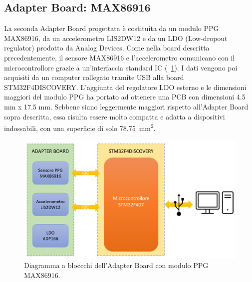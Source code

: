 \subsection{Adapter Board: MAX86916}
La seconda Adapter Board progettata è costituita da un modulo PPG MAX86916, da un accelerometro LIS2DW12 e da un LDO (Low-dropout regulator) prodotto da Analog Devices. Come nella board descritta precedentemente, il sensore MAX86916 e l'accelerometro comunicano con il microcontrollore grazie a un'interfaccia standard IC (\Fig~\ref{fig:DiagrammaBlocchiMAX86916}). I dati vengono poi acquisiti da un computer collegato tramite USB alla board STM32F4DISCOVERY. L'aggiunta del regolatore LDO esterno e le dimensioni maggiori del modulo PPG ha portato ad ottenere una PCB con dimensioni 4.5 mm x 17.5 mm. Sebbene siano leggermente maggiori rispetto all'Adapter Board sopra descritta, essa risulta essere molto compatta e adatta a dispositivi indossabili, con una superficie di solo \SI{78.75}{\square\milli\meter}.
\begin{figure}[h]
	\centering
	\includegraphics[width=0.6\linewidth]{ImageFiles/Hardware/DiagrammaBlocchiMAX86916}
	\caption{Diagramma a bloccchi dell'Adapter Board con modulo PPG MAX86916.}
	\label{fig:DiagrammaBlocchiMAX86916}
\end{figure}


